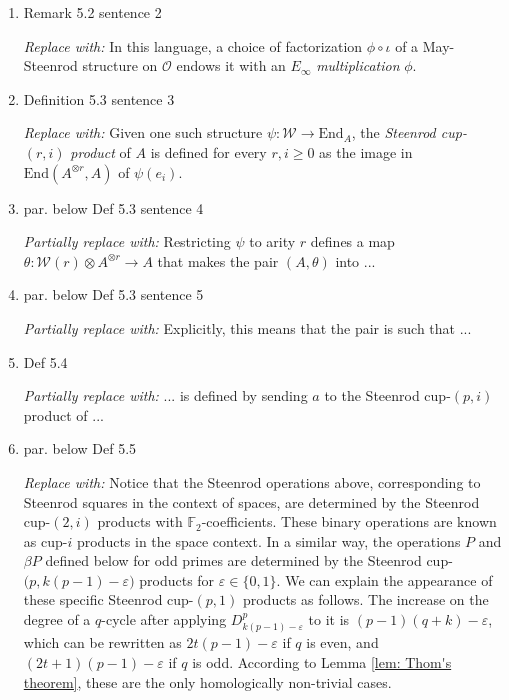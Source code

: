 \documentclass{amsart}
\theoremstyle{definition}
\newcommand{\End}{\mathrm{End}}
\begin{document}
\begin{enumerate}
\item Remark 5.2 sentence 2 \par
\textit{Replace with:}
In this language, a choice of factorization $\phi \circ \iota$ of a May-Steenrod structure on $\mathcal O$ endows it with an $E_\infty$ \textit{multiplication} $\phi$.

\item Definition 5.3 sentence 3 \par
\textit{Replace with:}
Given one such structure $\psi \colon \mathcal W \to \End_A$, the \textit{Steenrod cup-}$(r, i)$ \textit{product} of $A$ is defined for every $r, i \geq 0$ as the image in $ \mathrm{End}(A^{\otimes r}, A)$ of $\psi(e_i)$.

\item par. below Def 5.3 sentence 4 \par
\textit{Partially replace with:}
Restricting $\psi$ to arity $r$ defines a map $\theta \colon \mathcal W(r) \otimes A^{\otimes r} \to A$ that makes the pair $(A, \theta)$ into ...

\item par. below Def 5.3 sentence 5 \par
\textit{Partially replace with:}
Explicitly, this means that the pair is such that ...

\item Def 5.4 \par
\textit{Partially replace with:}
... is defined by sending $a$ to the Steenrod cup-$(p, i)$ product of ...

\item par. below Def 5.5 \par
\textit{Replace with:}
Notice that the Steenrod operations above, corresponding to Steenrod squares in the context of spaces, are determined by the Steenrod cup-$(2,i)$ products with $\mathbb{F}_2$-coefficients.
These binary operations are known as cup-$i$ products \cite{steenrod47products, medina2021newformulas} in the space context.
In a similar way, the operations $P$ and $\beta P$ defined below for odd primes are determined by the Steenrod cup-$\big(p, k(p-1)-\varepsilon\big)$ products for $\varepsilon \in \{0,1\}$.
We can explain the appearance of these specific Steenrod cup-$(p,1)$ products as follows.
The increase on the degree of a $q$-cycle after applying $D^p_{k(p-1)-\varepsilon}$ to it is $(p-1)(q+k) - \varepsilon$, which can be rewritten as $2t(p-1) - \varepsilon$ if $q$ is even, and $(2t+1)(p-1) - \varepsilon$ if $q$ is odd.
According to Lemma \ref{lem: Thom's theorem}, these are the only homologically non-trivial cases.


\end{enumerate}
\end{document}
